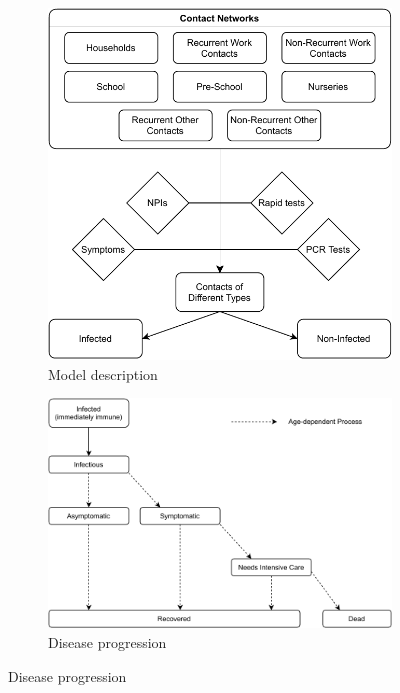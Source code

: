 \begin{figure}[!tp]
    \centering

    \begin{subfigure}[b]{0.475\textwidth}
        \centering
        \includegraphics[width=\textwidth]{../figures/model-graph-top-left}
        \caption{{\small Model description}}
        \label{fig:broad_model_description}
    \end{subfigure}
    \hfill
    \begin{subfigure}[b]{0.475\textwidth}
        \centering
        \includegraphics[width=\textwidth]{../figures/model-graph-top-right}
        \caption{Disease progression}
        \label{fig:disease_progression}
    \end{subfigure}


\end{figure}
